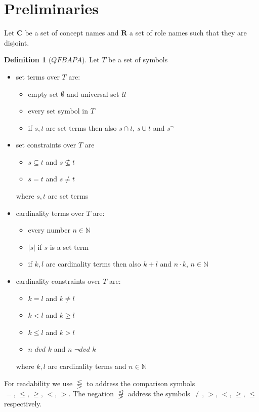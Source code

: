 \documentclass[a4paper,11pt]{scrartcl}
\theoremstyle{break}
\theoremstyle{definition}
\newtheorem{mydef}{Definition}
\begin{document}
\section{Preliminaries}
Let $\mathbf{C}$ be a set of concept names and $\mathbf{R}$ a set of role names such that they are disjoint.
\begin{mydef}[$QFBAPA$]
Let $T$ be a set of symbols
\begin{itemize}
\item set terms over $T$ are:
\begin{itemize}
\item empty set $\emptyset$ and universal set $
\mathcal{U}$
\item every set symbol in $T$
\item if $s,t$ are set terms then also $s\cap t$, $s\cup t$ and $s^{\neg}$
\end{itemize}
\item set constraints over $T$ are
\begin{itemize}
\item $s\subseteq t$ and $s\not\subseteq t$
\item $s=t$ and $s\neq t$
\end{itemize}
where $s,t$ are set terms
\item cardinality terms over $T$ are:
\begin{itemize}
\item every number $n\in \mathbb{N}$
\item $|s|$ if $s$ is a set term
\item if $k,l$ are cardinality terms then also $k+l$ and $n\cdot k$, $n\in \mathbb{N}$
\end{itemize}
\item cardinality constraints over $T$ are:
\begin{itemize}
\item $k=l$ and $k\neq l$
\item $k<l$ and $k\geq l$
\item $k\leq l$ and $k>l$
\item $n$ $dvd$ $k$ and $n$ $\neg dvd$ $k$
\end{itemize}
where $k,l$ are cardinality terms and $n\in\mathbb{N}$
\end{itemize}
\end{mydef}
For readability we use $\lesseqgtr$ to address the comparison symbols $=,\,\leq,\,\geq,\,<,\,>$. The negation $\not\lesseqgtr$ address the symbols $\neq,\,>,\,<,\,\geq,\,\leq$ respectively.\\
\end{document}
